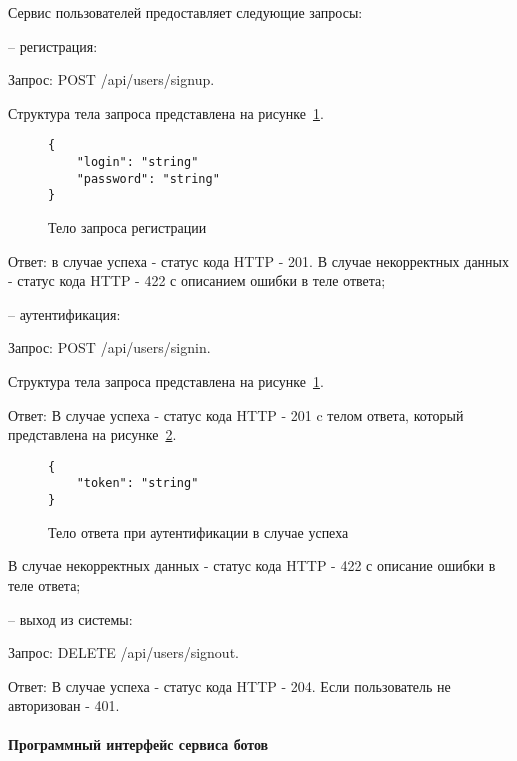 Сервис пользователей предоставляет следующие запросы:

-- \hspace{\clabelsep} регистрация:

Запрос: POST /api/users/signup.

Структура тела запроса представлена на рисунке~\ref{f:signup-request-body}.

\begin{figure}[ht]
	\centering
	\vspace{\toppaddingoffigure}
	\begin{lstlisting}
{
    "login": "string"
    "password": "string"
}
    \end{lstlisting}
	\caption{Тело запроса регистрации}
	\label{f:signup-request-body}
\end{figure}

Ответ: в случае успеха - статус кода HTTP - 201. В случае некорректных
данных - статус кода HTTP - 422 с описанием ошибки в теле ответа;


-- \hspace{\clabelsep} аутентификация:

Запрос: POST /api/users/signin.

Структура тела запроса представлена на рисунке~\ref{f:signup-request-body}.

Ответ: В случае успеха - статус кода HTTP - 201 c телом ответа, который
представлена на рисунке~\ref{f:signin-response-body}.

\begin{figure}[ht]
	\centering
	\vspace{\toppaddingoffigure}
	\begin{lstlisting}
{
    "token": "string"
}
    \end{lstlisting}
	\caption{Тело ответа при аутентификации в случае успеха}
	\label{f:signin-response-body}
\end{figure}

В случае некорректных данных - статус кода HTTP - 422 с описание
ошибки в теле ответа;

-- \hspace{\clabelsep} выход из системы:

Запрос: DELETE /api/users/signout.

Ответ: В случае успеха - статус кода HTTP - 204. Если пользователь не
авторизован - 401.

\paragraph{Программный интерфейс сервиса ботов}

